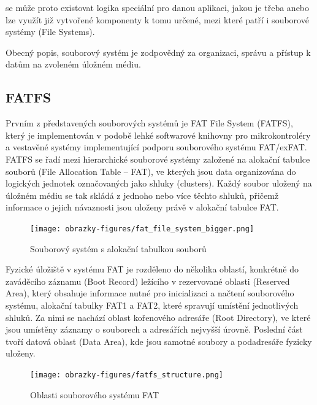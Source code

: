 se  může proto existovat logika speciální pro danou aplikaci, jakou je třeba anebo lze využít již vytvořené komponenty k tomu určené, mezi které patří i souborové systémy (File Systems).

Obecný popis, souborový systém je zodpovědný za organizaci, správu a přístup k datům na zvoleném úložném médiu.

\subsection{FATFS}
Prvním z představených souborových systémů je FAT File System (FATFS), který je implementován v podobě lehké softwarové knihovny pro mikrokontroléry a vestavěné systémy implementující podporu souborového systému FAT/exFAT. FATFS se řadí mezi hierarchické souborové systémy založené na alokační tabulce souborů (File Allocation Table – FAT), ve kterých jsou data organizována do logických jednotek označovaných jako shluky (clusters). Každý soubor uložený na úložném médiu se tak skládá z jednoho nebo více těchto shluků, přičemž informace o jejich návaznosti jsou uloženy právě v alokační tabulce FAT. \cite{recoverit_fat_filesystem, elm_fat_filesystem_docs}

\begin{figure}[h]
    \centering
    \texttt{[image: obrazky-figures/fat\_file\_system\_bigger.png]}
    
    \caption{Souborový systém s alokační tabulkou souborů \cite{recoverit_fat_filesystem}}
    \label{fig:fat-file-system-structure}
\end{figure}

Fyzické úložiště v systému FAT je rozděleno do několika oblastí, konkrétně do zaváděcího záznamu (Boot Record) ležícího v rezervované oblasti (Reserved Area), který obsahuje informace nutné pro inicializaci a načtení souborového systému, alokační tabulky FAT1 a FAT2, které spravují umístění jednotlivých shluků.  Za nimi se nachází oblast kořenového adresáře (Root Directory), ve které jsou umístěny záznamy o souborech a adresářích nejvyšší úrovně. Poslední část tvoří datová oblast (Data Area), kde jsou samotné soubory a podadresáře fyzicky uloženy.

\begin{figure}[h]
    \centering
    \texttt{[image: obrazky-figures/fatfs\_structure.png]}
    
    \caption{Oblasti souborového systému FAT \cite{recoverit_fat_filesystem}}
    \label{fig:fatfs-structure}
\end{figure}

